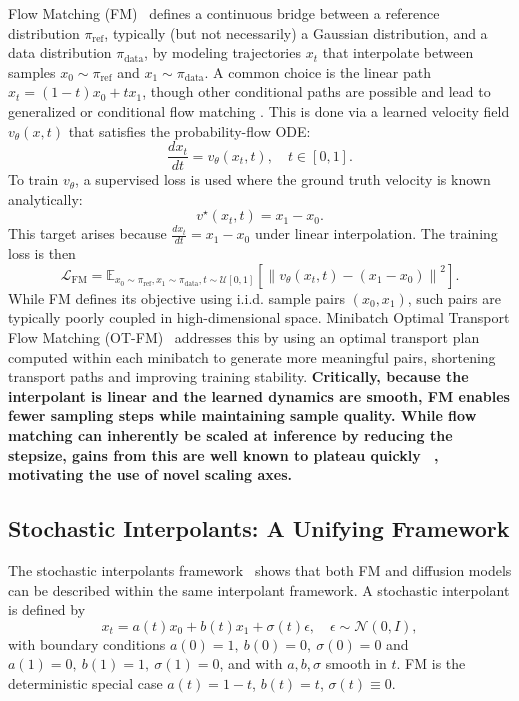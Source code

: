 \documentclass{article} %
\begin{document}
Flow Matching (FM)~\cite{lipman2023fm} defines a continuous bridge between a reference distribution \(\pi_{\mathrm{ref}}\), typically (but not necessarily) a Gaussian distribution, and a data distribution \(\pi_{\mathrm{data}}\), by modeling trajectories \(x_t\) that interpolate between samples \(x_0 \sim \pi_{\mathrm{ref}}\) and \(x_1 \sim \pi_{\mathrm{data}}\). A common choice is the linear path $x_t = (1-t)x_0 + tx_1$, though other conditional paths are possible and lead to generalized or conditional flow matching \cite{tong2024otfm, song2021score, albergo2023stochastic_interpolants}. This is done via a learned velocity field \(v_\theta(x, t)\) that satisfies the probability-flow ODE:
\[
\frac{dx_t}{dt} = v_\theta(x_t, t), \quad t \in [0,1].
\]
To train \(v_\theta\), a supervised loss is used where the ground truth velocity is known analytically:
\[
v^\star(x_t, t) = x_1 - x_0.
\]
This target arises because \(\frac{dx_t}{dt} = x_1 - x_0\) under linear interpolation. The training loss is then
\[
\mathcal{L}_{\mathrm{FM}} = \mathbb{E}_{x_0 \sim \pi_{\mathrm{ref}}, x_1 \sim \pi_{\mathrm{data}}, t \sim \mathcal{U}[0,1]} \left[ \left\| v_\theta(x_t, t) - (x_1 - x_0) \right\|^2 \right].
\]
While FM defines its objective using i.i.d. sample pairs \((x_0, x_1)\), such pairs are typically poorly coupled in high-dimensional space. Minibatch Optimal Transport Flow Matching (OT-FM)~\cite{tong2024otfm} addresses this by using an optimal transport plan computed within each minibatch to generate more meaningful pairs, shortening transport paths and improving training stability. \textbf{Critically, because the interpolant is linear and the learned dynamics are smooth, FM enables fewer sampling steps while maintaining sample quality. While flow matching can inherently be scaled at inference by reducing the stepsize, gains from this are well known to plateau quickly ~\cite{lipman2023fm}, motivating the use of novel scaling axes.}

\subsection{Stochastic Interpolants: A Unifying Framework}

The stochastic interpolants framework~\cite{albergo2023stochastic_interpolants, ma2024sit} shows that both FM and diffusion models can be described within the same interpolant framework. A stochastic interpolant is defined by
\[
x_t = a(t) x_0 + b(t) x_1 + \sigma(t) \epsilon, \quad \epsilon \sim \mathcal{N}(0, I),
\]
with boundary conditions $a(0)=1,\ b(0)=0,\ \sigma(0)=0$ and $a(1)=0,\ b(1)=1,\ \sigma(1)=0$,
and with $a,b,\sigma$ smooth in $t$. FM is the deterministic special case $a(t)=1-t$, $b(t)=t$, $\sigma(t)\equiv 0$.
\end{document}
